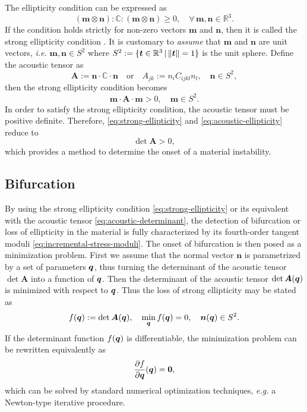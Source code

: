 \documentclass[12pt]{article}
\newcommand{\mbs}[1]{\boldsymbol{#1}}
\newcommand{\mbb}[1]{\mathbb{#1}}
\def\bA{{\mbs{A}}} \def\bB{{\mbs{B}}} \def\bC{{\mbs{C}}}
\def\bm{{\mbs{m}}} \def\bn{{\mbs{n}}} \def\bo{{\mbs{o}}}
\numberwithin{equation}{section}
\begin{document}
The ellipticity condition can be expressed as
\begin{equation} \label{eq:strong-ellipticity}
  (\bm \otimes \bn) : \mbb{C} : (\bm \otimes \bn) \ge 0,
  \quad
  \forall \, \bm, \bn \in \mbb{R}^3.
\end{equation}
If the condition holds strictly for non-zero vectors $\bm$ and $\bn$,
then it is called the strong ellipticity condition
\citep{Hadamard:1903, Truesdell.Noll:2004,
  Miehe.Lambrecht.Gurses:2004}. It is customary to \emph{assume} that
$\bm$ and $\bn$ are unit vectors, \emph{i.e.} $\bm, \bn \in S^2$ where
$S^2 := \{ \bt \in \mbb{R}^3 \, | \, \| \bt \| = 1\}$ is the unit
sphere. Define the acoustic tensor as
\begin{equation} \label{eq:acoustic-tensor}
  \bA := \bn \cdot \mbb{C} \cdot \bn
  \quad \text{or} \quad
  A_{jk} := n_i C_{ijkl} n_l,
  \quad
  \bn \in S^2,
\end{equation}
then the strong ellipticity condition becomes
\begin{equation} \label{eq:acoustic-ellipticity}
  \bm \cdot \bA \cdot \bm > 0, \quad \bm \in S^2.
\end{equation}
In order to satisfy the strong ellipticity condition, the acoustic
tensor must be positive definite. Therefore,
\eqref{eq:strong-ellipticity} and \eqref{eq:acoustic-ellipticity}
reduce to
\begin{equation} \label{eq:acoustic-determinant}
  \det \bA > 0,
\end{equation}
which provides a method to determine the onset of a material
instability.

\subsection{Bifurcation}

By using the strong ellipticity condition
\eqref{eq:strong-ellipticity} or its equivalent with the acoustic
tensor \eqref{eq:acoustic-determinant}, the detection of bifurcation
or loss of ellipticity in the material is fully characterized by its
fourth-order tangent moduli \eqref{eq:incremental-stress-moduli}. The
onset of bifurcation is then posed as a minimization problem.  First
we assume that the normal vector $\bn$ is parametrized by a set of
parameters $\bq$, thus turning the determinant of the acoustic tensor
$\det \bA$ into a function of $\bq$.  Then the determinant of the
acoustic tensor $\det \bA(\bq)$ is minimized with respect to
$\bq$. Thus the loss of strong ellipticity may be stated as
\begin{equation} \label{eq:minimization-determinant}
  f(\bq) := \det \bA(\bq),
  \quad
  \min_{\bq} f(\bq) = 0,
  \quad
  \bn(\bq) \in S^2.
\end{equation}
If the determinant function $f(\bq)$ is differentiable, the
minimization problem can be rewritten equivalently as
\begin{equation}\label{eq:minimization-derivative}
  \frac{\partial f}{\partial \bq}(\bq) = \mathbf{0},
\end{equation}
which can be solved by standard numerical optimization techniques,
\emph{e.g.} a Newton-type iterative procedure.
\end{document}
